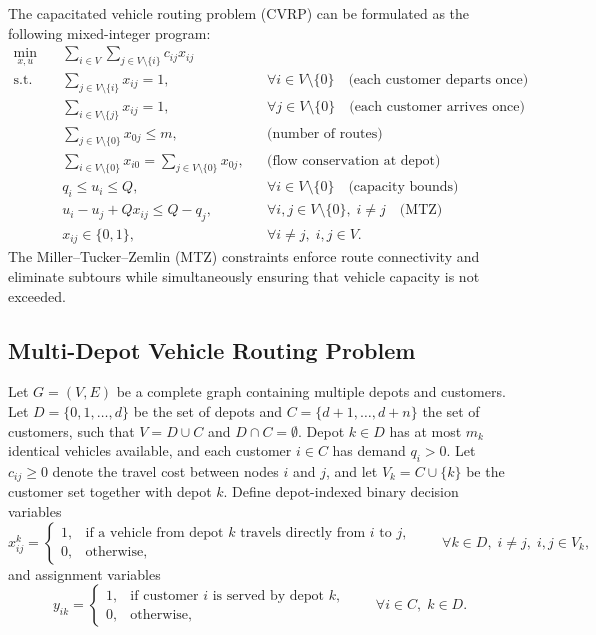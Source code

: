 The capacitated vehicle routing problem (CVRP) can be formulated as the following
mixed-integer program:
\[
\begin{aligned}
\min_{x,u}\quad & \sum_{i\in V}\sum_{j\in V\setminus\{i\}} c_{ij}x_{ij}\\
\text{s.t.}\quad
& \sum_{j\in V\setminus\{i\}} x_{ij} = 1, && \forall i\in V\setminus\{0\}
  \quad \text{(each customer departs once)}\\
& \sum_{i\in V\setminus\{j\}} x_{ij} = 1, && \forall j\in V\setminus\{0\}
  \quad \text{(each customer arrives once)}\\
& \sum_{j\in V\setminus\{0\}} x_{0j} \le m, && \text{(number of routes)}\\
& \sum_{i\in V\setminus\{0\}} x_{i0}
  = \sum_{j\in V\setminus\{0\}} x_{0j}, && \text{(flow conservation at depot)}\\
& q_i \le u_i \le Q, && \forall i\in V\setminus\{0\}
  \quad \text{(capacity bounds)}\\
& u_i - u_j + Qx_{ij} \le Q - q_j, &&
  \forall i,j\in V\setminus\{0\},\; i\ne j
  \quad \text{(MTZ)}\\
& x_{ij}\in\{0,1\}, && \forall i\ne j,\; i,j\in V.
\end{aligned}
\]
The Miller--Tucker--Zemlin (MTZ) constraints enforce route connectivity and eliminate
subtours while simultaneously ensuring that vehicle capacity is not exceeded.

\subsection{Multi-Depot Vehicle Routing Problem}
\label{subsec:mdvrp}

Let $G=(V,E)$ be a complete graph containing multiple depots and customers. Let
$D=\{0,1,\dots,d\}$ be the set of depots and $C=\{d+1,\dots,d+n\}$ the set of customers, such
that $V=D\cup C$ and $D\cap C=\emptyset$. Depot $k\in D$ has at most $m_k$ identical vehicles
available, and each customer $i\in C$ has demand $q_i>0$. Let $c_{ij}\ge 0$ denote the travel
cost between nodes $i$ and $j$, and let $V_k=C\cup\{k\}$ be the customer set together with
depot $k$. Define depot-indexed binary decision variables
\[
x_{ij}^k=
\begin{cases}
1, & \text{if a vehicle from depot } k \text{ travels directly from } i \text{ to } j,\\
0, & \text{otherwise,}
\end{cases}
\qquad \forall k\in D,\; i\ne j,\; i,j\in V_k,
\]
and assignment variables
\[
y_{ik}=
\begin{cases}
1, & \text{if customer } i \text{ is served by depot } k,\\
0, & \text{otherwise,}
\end{cases}
\qquad \forall i\in C,\; k\in D.
\]

